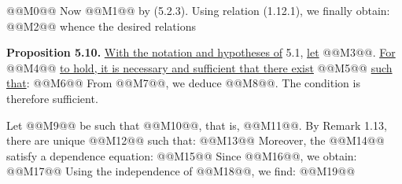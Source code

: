 @@M0@@
Now @@M1@@ by (5.2.3).
Using relation (1.12.1), we finally obtain:
@@M2@@
whence the desired relations

\textbf{Proposition 5.10.} \uline{With the notation and hypotheses of} 5.1, \uline{let} @@M3@@. \uline{For} @@M4@@ \uline{to hold, it is necessary and sufficient that there exist} @@M5@@ \uline{such that}:
@@M6@@
From @@M7@@, we deduce @@M8@@. The condition is therefore sufficient.

Let @@M9@@ be such that @@M10@@, that is, @@M11@@. By Remark 1.13, there are unique @@M12@@ such that:
@@M13@@
Moreover, the @@M14@@ satisfy a dependence equation:
@@M15@@
Since @@M16@@, we obtain:
@@M17@@
Using the independence of @@M18@@, we find:
@@M19@@
